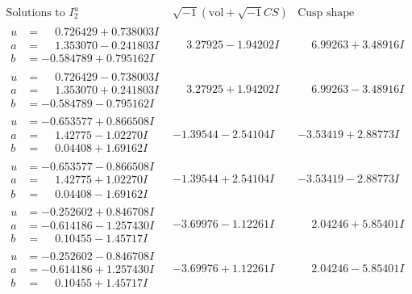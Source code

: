 \documentclass[1p]{elsarticle_modified}
\theoremstyle{definition}
\newcommand{\I}{\sqrt{-1}}
\begin{document}
$$\begin{array}{c|c|c}  
\text{Solutions to }I^u_{2}& \I (\text{vol} + \sqrt{-1}CS) & \text{Cusp shape}\\
 \hline 
\begin{aligned}
u &= \phantom{-}0.726429 + 0.738003 I \\
a &= \phantom{-}1.353070 - 0.241803 I \\
b &= -0.584789 + 0.795162 I\end{aligned}
 & \phantom{-}3.27925 - 1.94202 I & \phantom{-}6.99263 + 3.48916 I \\ \hline\begin{aligned}
u &= \phantom{-}0.726429 - 0.738003 I \\
a &= \phantom{-}1.353070 + 0.241803 I \\
b &= -0.584789 - 0.795162 I\end{aligned}
 & \phantom{-}3.27925 + 1.94202 I & \phantom{-}6.99263 - 3.48916 I \\ \hline\begin{aligned}
u &= -0.653577 + 0.866508 I \\
a &= \phantom{-}1.42775 - 1.02270 I \\
b &= \phantom{-}0.04408 + 1.69162 I\end{aligned}
 & -1.39544 - 2.54104 I & -3.53419 + 2.88773 I \\ \hline\begin{aligned}
u &= -0.653577 - 0.866508 I \\
a &= \phantom{-}1.42775 + 1.02270 I \\
b &= \phantom{-}0.04408 - 1.69162 I\end{aligned}
 & -1.39544 + 2.54104 I & -3.53419 - 2.88773 I \\ \hline\begin{aligned}
u &= -0.252602 + 0.846708 I \\
a &= -0.614186 - 1.257430 I \\
b &= \phantom{-}0.10455 - 1.45717 I\end{aligned}
 & -3.69976 - 1.12261 I & \phantom{-}2.04246 + 5.85401 I \\ \hline\begin{aligned}
u &= -0.252602 - 0.846708 I \\
a &= -0.614186 + 1.257430 I \\
b &= \phantom{-}0.10455 + 1.45717 I\end{aligned}
 & -3.69976 + 1.12261 I & \phantom{-}2.04246 - 5.85401 I \\ \hline\begin{aligned}

\end{aligned}
\end{array}$$
\end{document}
